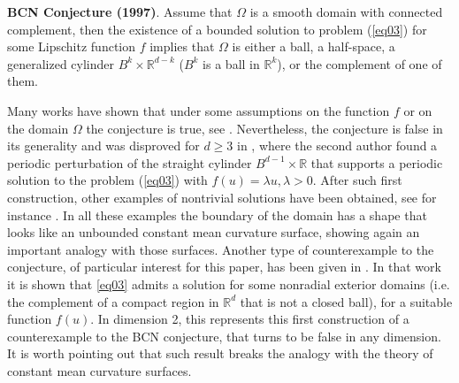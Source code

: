 \documentclass[reqno]{amsart}
\numberwithin{equation}{section}
\newenvironment{key words}{\textbf{Keywords}\mbox{  }}{ }
\begin{document}
\textbf{BCN Conjecture (1997)}. Assume that $\Omega$ is a smooth domain with connected complement, then the existence of a bounded solution to problem (\ref{eq03}) for some Lipschitz function $f$ implies that $\Omega$ is either a ball, a half-space, a generalized cylinder $B^{k}\times\mathbb{R}^{d-k}$ ($B^{k}$ is a ball in $\mathbb{R}^{k}$), or the complement of one of them.

\medskip

Many works have shown that under some assumptions on the function $f$ or on the domain $\Omega$ the conjecture is true, see \cite{FV10, HLSWW, HHP11, R97, RRS17, RS13, T13}.
Nevertheless, the conjecture is false in its generality and was disproved for $d\geq3$ in \cite{S10}, where the second author found a periodic perturbation of the straight cylinder $B^{d-1}\times\mathbb{R}$ that supports a periodic solution to the problem (\ref{eq03}) with $f(u)=\lambda u, \lambda>0$. After such first construction, other examples of nontrivial solutions have been obtained, see for instance \cite{DPW15, FMW17, LWW, RSW21, SS12}. In all these examples the boundary of the domain has a shape that looks like an unbounded constant mean curvature surface, showing again an important analogy with those surfaces. Another type of counterexample to the conjecture, of particular interest for this paper, has been given in \cite{RRS20}. In that work it is shown that \eqref{eq03} admits a solution for some nonradial exterior domains (i.e. the complement of a compact region in $\mathbb{R}^d$ that is not a closed ball), for a suitable function $f(u)$. In dimension 2, this represents this first construction of a counterexample to the BCN conjecture, that turns to be false in any dimension. It is worth pointing out that such result breaks the analogy with the theory of constant mean curvature surfaces.
\medskip
\end{document}

